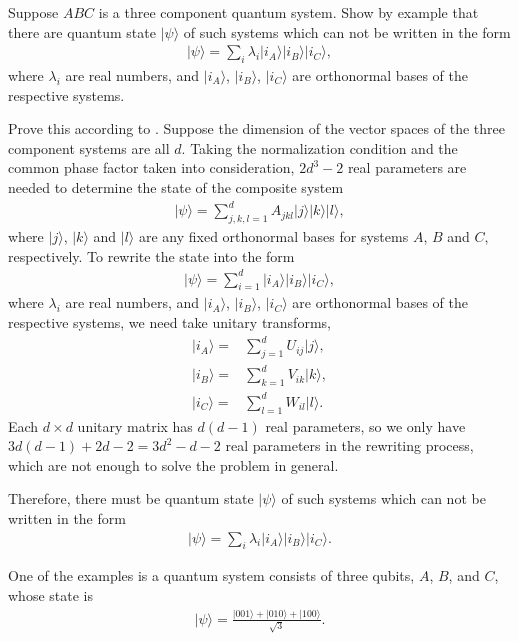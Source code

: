 \documentclass[en]{sol-man}
\begin{document}
\begin{exe}
    Suppose $ABC$ is a three component quantum system. Show by example that there are quantum state $\lvert\psi\rangle$ of such systems which can not be written in the form
    \begin{align}
        \lvert\psi\rangle=\sum_i\lambda_i\lvert i_A\rangle\lvert i_B\rangle\lvert i_C\rangle,
    \end{align}
    where $\lambda_i$ are real numbers, and $\lvert i_A\rangle$, $\lvert i_B\rangle$, $\lvert i_C\rangle$ are orthonormal bases of the respective systems.
\end{exe}
\begin{sol}
    Prove this according to \cite{peres1995higher}. Suppose the dimension of the vector spaces of the three component systems are all $d$. Taking the normalization condition and the common phase factor taken into consideration, $2d^3-2$ real parameters are needed to determine the state of the composite system
    \begin{align}
        \lvert\psi\rangle=\sum_{j,k,l=1}^dA_{jkl}\lvert j\rangle\lvert k\rangle\lvert l\rangle,
    \end{align}
    where $\lvert j\rangle$, $\lvert k\rangle$ and $\lvert l\rangle$ are any fixed orthonormal bases for systems $A$, $B$ and $C$, respectively.
    To rewrite the state into the form
    \begin{align}
        \lvert\psi\rangle=\sum_{i=1}^d\lvert i_A\rangle\lvert i_B\rangle\lvert i_C\rangle,
    \end{align}
    where $\lambda_i$ are real numbers, and $\lvert i_A\rangle$, $\lvert i_B\rangle$, $\lvert i_C\rangle$ are orthonormal bases of the respective systems, we need take unitary transforms,
    \begin{align}
        \lvert i_A\rangle=&\sum_{j=1}^dU_{ij}\lvert j\rangle,\\
        \lvert i_B\rangle=&\sum_{k=1}^dV_{ik}\lvert k\rangle,\\
        \lvert i_C\rangle=&\sum_{l=1}^dW_{il}\lvert l\rangle.
    \end{align}
    Each $d\times d$ unitary matrix has $d(d-1)$ real parameters, so we only have $3d(d-1)+2d-2=3d^2-d-2$ real parameters in the rewriting process, which are not enough to solve the problem in general.

    Therefore, there must be quantum state $\lvert\psi\rangle$ of such systems which can not be written in the form
    \begin{align}
        \lvert\psi\rangle=\sum_i\lambda_i\lvert i_A\rangle\lvert i_B\rangle\lvert i_C\rangle.
    \end{align}

    One of the examples is a quantum system consists of three qubits, $A$, $B$, and $C$, whose state is
    \begin{align}
        \lvert\psi\rangle=\frac{\lvert 001\rangle+\lvert 010\rangle+\lvert 100\rangle}{\sqrt{3}}.
    \end{align}
\end{sol}
\end{document}
